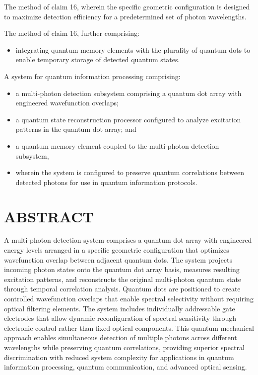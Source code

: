 \documentclass[12pt,letterpaper]{article}
\begin{document}
\begin{patentclaims}
    \item The method of claim 16, wherein the specific geometric configuration is designed to maximize detection efficiency for a predetermined set of photon wavelengths.
    
    \item The method of claim 16, further comprising:
    \begin{itemize}[leftmargin=2em]
        \item integrating quantum memory elements with the plurality of quantum dots to enable temporary storage of detected quantum states.
    \end{itemize}
    
    \item A system for quantum information processing comprising:
    \begin{itemize}[leftmargin=2em]
        \item a multi-photon detection subsystem comprising a quantum dot array with engineered wavefunction overlaps;
        \item a quantum state reconstruction processor configured to analyze excitation patterns in the quantum dot array; and
        \item a quantum memory element coupled to the multi-photon detection subsystem,
        \item wherein the system is configured to preserve quantum correlations between detected photons for use in quantum information protocols.
    \end{itemize}
\end{patentclaims}

\newpage
\section*{ABSTRACT}

A multi-photon detection system comprises a quantum dot array with engineered energy levels arranged in a specific geometric configuration that optimizes wavefunction overlap between adjacent quantum dots. The system projects incoming photon states onto the quantum dot array basis, measures resulting excitation patterns, and reconstructs the original multi-photon quantum state through temporal correlation analysis. Quantum dots are positioned to create controlled wavefunction overlaps that enable spectral selectivity without requiring optical filtering elements. The system includes individually addressable gate electrodes that allow dynamic reconfiguration of spectral sensitivity through electronic control rather than fixed optical components. This quantum-mechanical approach enables simultaneous detection of multiple photons across different wavelengths while preserving quantum correlations, providing superior spectral discrimination with reduced system complexity for applications in quantum information processing, quantum communication, and advanced optical sensing.
\end{document}
